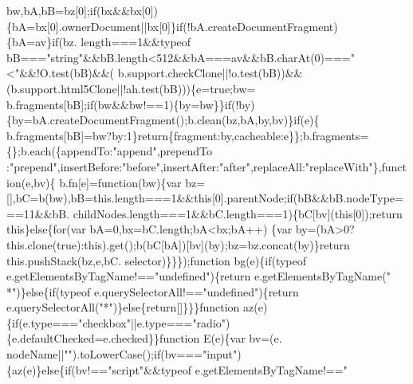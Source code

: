 \begin{DoxyCode}
      bw,bA,bB=bz[0];\textcolor{keywordflow}{if}(bx&&bx[0])\{bA=bx[0].ownerDocument||bx[0]\}\textcolor{keywordflow}{if}(!bA.createDocumentFragment)\{bA=av\}\textcolor{keywordflow}{if}(bz.
      length===1&&typeof bB===\textcolor{stringliteral}{"string"}&&bB.length<512&&bA===av&&bB.charAt(0)===\textcolor{stringliteral}{"<"}&&!O.test(bB)&&(
      b.support.checkClone||!o.test(bB))&&(b.support.html5Clone||!ah.test(bB)))\{e=\textcolor{keyword}{true};bw=
      b.fragments[bB];\textcolor{keywordflow}{if}(bw&&bw!==1)\{by=bw\}\}\textcolor{keywordflow}{if}(!by)\{by=bA.createDocumentFragment();b.clean(bz,bA,by,bv)\}\textcolor{keywordflow}{if}(e)\{
      b.fragments[bB]=bw?by:1\}\textcolor{keywordflow}{return}\{fragment:by,cacheable:e\}\};b.fragments=\{\};b.each(\{appendTo:\textcolor{stringliteral}{"append"},prependTo
      :\textcolor{stringliteral}{"prepend"},insertBefore:\textcolor{stringliteral}{"before"},insertAfter:\textcolor{stringliteral}{"after"},replaceAll:\textcolor{stringliteral}{"replaceWith"}\},\textcolor{keyword}{function}(e,bv)\{
      b.fn[e]=\textcolor{keyword}{function}(bw)\{var bz=[],bC=b(bw),bB=this.length===1&&\textcolor{keyword}{this}[0].parentNode;\textcolor{keywordflow}{if}(bB&&bB.nodeType===11&&bB.
      childNodes.length===1&&bC.length===1)\{bC[bv](\textcolor{keyword}{this}[0]);\textcolor{keywordflow}{return} \textcolor{keyword}{this}\}\textcolor{keywordflow}{else}\{\textcolor{keywordflow}{for}(var bA=0,bx=bC.length;bA<bx;bA++)
      \{var by=(bA>0?this.clone(\textcolor{keyword}{true}):this).get();b(bC[bA])[bv](by);bz=bz.concat(by)\}\textcolor{keywordflow}{return} this.pushStack(bz,e,bC.
      selector)\}\}\});\textcolor{keyword}{function} bg(e)\{\textcolor{keywordflow}{if}(typeof e.getElementsByTagName!==\textcolor{stringliteral}{"undefined"})\{\textcolor{keywordflow}{return} e.getElementsByTagName(\textcolor{stringliteral}{"
      *"})\}\textcolor{keywordflow}{else}\{\textcolor{keywordflow}{if}(typeof e.querySelectorAll!==\textcolor{stringliteral}{"undefined"})\{\textcolor{keywordflow}{return} e.querySelectorAll(\textcolor{stringliteral}{"*"})\}\textcolor{keywordflow}{else}\{\textcolor{keywordflow}{return}[]\}\}\}\textcolor{keyword}{function}
       az(e)\{\textcolor{keywordflow}{if}(e.type===\textcolor{stringliteral}{"checkbox"}||e.type===\textcolor{stringliteral}{"radio"})\{e.defaultChecked=e.checked\}\}\textcolor{keyword}{function} E(e)\{var bv=(e.
      nodeName||\textcolor{stringliteral}{""}).toLowerCase();\textcolor{keywordflow}{if}(bv===\textcolor{stringliteral}{"input"})\{az(e)\}\textcolor{keywordflow}{else}\{\textcolor{keywordflow}{if}(bv!==\textcolor{stringliteral}{"script"}&&typeof e.getElementsByTagName!==\textcolor{stringliteral}{"
}
\end{DoxyCode}
